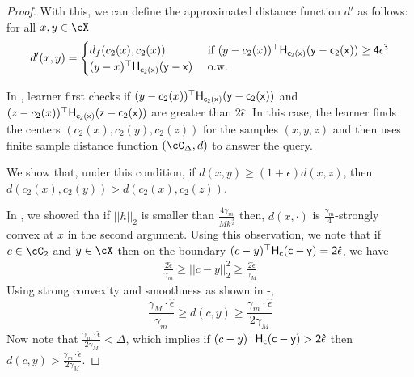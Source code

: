\begin{proof}
    With this, we can define the approximated distance function $d'$ as follows: for all $x,y \in \cX$
    \begin{equation}
        d'(x,y) = \begin{cases}
            d_{f}(c_2(x), c_2(x)) & \textnormal{ if } (y - c_2(x))^{\top}\sf{H}_{c_2(x)}(y - c_2(x)) \ge 4\epsilon^3\\
             (y - x)^{\top}\sf{H}_{c_2(x)}(y - x) & \textnormal{ o.w. }
        \end{cases}
    \end{equation}

    In , learner first checks if $(y - c_2(x))^{\top}\sf{H}_{c_2(x)}(y - c_2(x))$ and $(z - c_2(x))^{\top}\sf{H}_{c_2(x)}(z - c_2(x))$ are greater than $2 \hat{\epsilon}$. In this case, the learner finds the centers $(c_2(x), c_2(y),c_2(z))$ for the samples $(x,y,z)$ and then uses finite sample distance function $(\cC_\Delta,d)$ to answer the query.
    
    We show that, under this condition, if $d(x,y) \ge (1 + \epsilon) d(x,z)$, then $d(c_2(x),c_2(y)) > d(c_2(x),c_2(z))$.

    In , we showed tha if $||h||_2$ is smaller than $\frac{4\gamma_m}{Mk^{\frac{3}{2}}}$ then, $d(x,\cdot)$ is $\frac{\gamma_m}{4}$-strongly convex at $x$ in the second argument. Using this observation, we note that if $c \in \cC_2$ and $y \in \cX$ then on the boundary  $(c - y)^{\top}\sf{H}_c(c - y) = 2 \hat{\epsilon}$, we have
    \begin{align*}
        \frac{2\hat{\epsilon}}{\gamma_m}  \ge ||c - y||_2^2 \ge \frac{2\hat{\epsilon}}{\gamma_M}
    \end{align*}
    Using strong convexity and smoothness as shown in -,
    \begin{equation*}
         \frac{\gamma_M\cdot \hat{\epsilon}}{\gamma_m} \ge d(c,y) \ge \frac{\gamma_m\cdot \hat{\epsilon}}{2\gamma_M}
    \end{equation*}
    Now note that $\frac{\gamma_m\cdot \hat{\epsilon}}{2\gamma_M} < \Delta$, which implies if $(c - y)^{\top}\sf{H}_c(c - y) > 2\hat{\epsilon}$ then $d(c,y) > \frac{\gamma_m\cdot \hat{\epsilon}}{2\gamma_M}$.


\end{proof}
